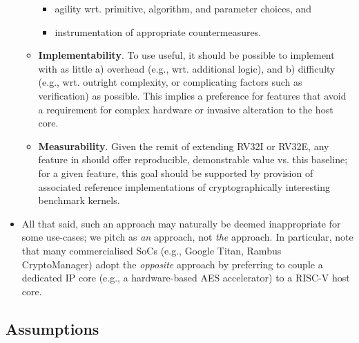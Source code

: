 \documentclass{article}
\begin{document}
\begin{itemize}
\begin{itemize}
            \begin{itemize}
            \item agility wrt. primitive, algorithm, and parameter choices,
                  and
            \item instrumentation of appropriate countermeasures.
            \end{itemize}

      \item {\bf Implementability}. 
            To use useful, it should be possible to implement \ISE with as
            little
            a) overhead   (e.g., wrt. additional logic),
               and
            b) difficulty (e.g., wrt. outright complexity, or complicating factors such as verification)
            as possible.
            This implies a preference for features that avoid a requirement 
            for complex hardware or invasive alteration to the host core.

      \item {\bf    Measurability}.
            Given the remit of extending RV32I or RV32E, any feature in \ISE
            should offer reproducible, demonstrable value vs. this baseline; 
            for a given feature, this goal should be supported by provision
            of associated reference implementations of cryptographically 
            interesting benchmark kernels.

      \end{itemize}

\item All that said, such an approach may naturally be deemed inappropriate 
      for some use-cases; we pitch \ISE as {\em an} approach, not {\em the}
      approach.  In particular, note that many commercialised SoCs 
      (e.g., Google Titan, Rambus CryptoManager) 
      adopt the {\em opposite} approach by preferring to couple a dedicated
      IP core 
      (e.g., a hardware-based AES accelerator) 
      to a RISC-V host core.

\end{itemize}


\subsection*{Assumptions}
\end{document}
